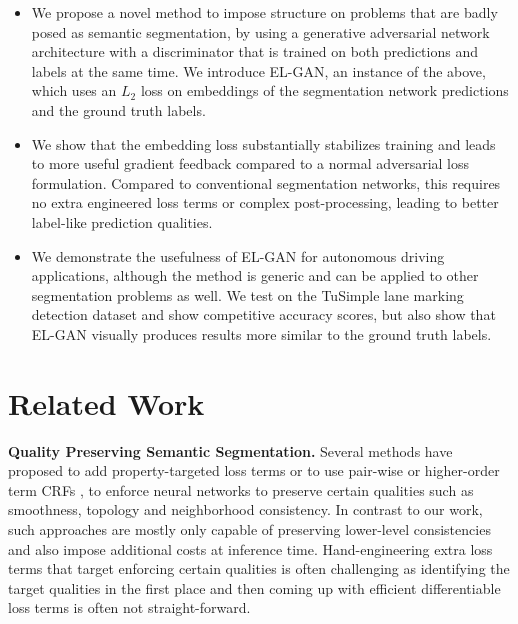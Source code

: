 \documentclass{article} \usepackage{nips13submit_e,times}
\newcommand{\elgan}{\mbox{EL-GAN}}
\begin{document}
\begin{itemize}

  \item
  We propose a novel method to impose structure on problems that are badly posed as semantic segmentation, by using a generative adversarial network architecture with a discriminator that is trained on both predictions and labels at the same time.
  We introduce \elgan{}, an instance of the above, which uses an $L_2$ loss on embeddings of the segmentation network predictions and the ground truth labels.

  \item
  We show that the embedding loss substantially stabilizes training and leads to more useful gradient feedback compared to a normal adversarial loss formulation.
  Compared to conventional segmentation networks, this requires no extra engineered loss terms or complex post-processing, leading to better label-like prediction qualities.


  \item
  We demonstrate the usefulness of \elgan{} for autonomous driving applications, although the method is generic and can be applied to other segmentation problems as well.
  We test on the TuSimple lane marking detection dataset and show competitive accuracy scores, but also show that \elgan{} visually produces results more similar to the ground truth labels.


\end{itemize}



\section{Related Work}



\textbf{Quality Preserving Semantic Segmentation.}
Several methods have proposed to add property-targeted loss terms \cite{bentaieb2016topology,oktay2017anatomically} or to use pair-wise or higher-order term CRFs \cite{krahenbuhl2011efficient,zheng2015conditional,schwing2015fully}, to enforce neural networks to preserve certain qualities such as smoothness, topology and neighborhood consistency. 
In contrast to our work, such approaches are mostly only capable of preserving lower-level consistencies and also impose additional costs at inference time.
Hand-engineering extra loss terms that target enforcing certain qualities is often challenging as identifying the target qualities in the first place and then coming up with efficient differentiable loss terms is often not straight-forward.
\end{document}
